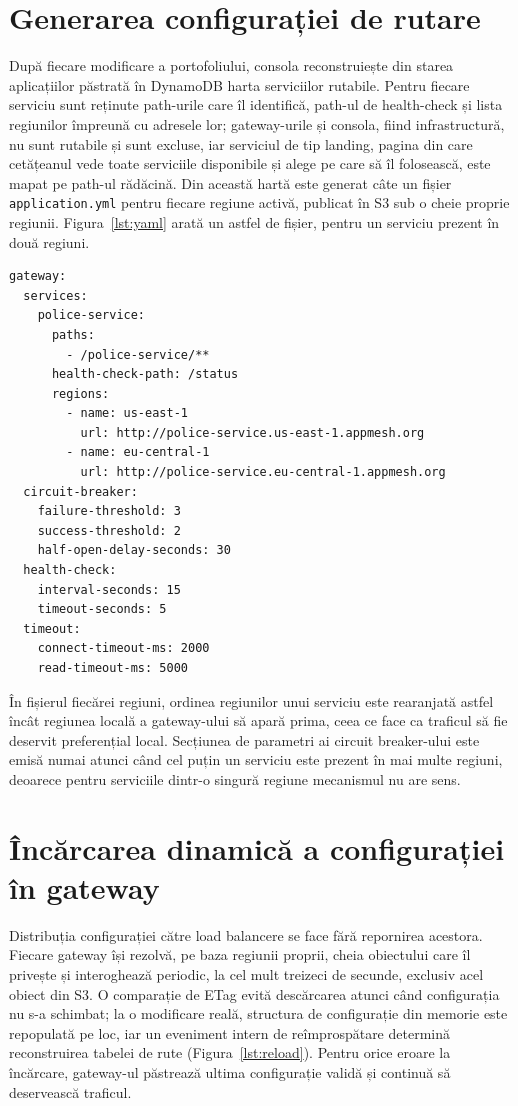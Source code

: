 \documentclass[12pt,a4paper]{report}
\begin{document}
\section{Generarea configurației de rutare}
După fiecare modificare a portofoliului, consola reconstruiește din starea aplicațiilor păstrată în DynamoDB harta serviciilor rutabile. Pentru fiecare serviciu sunt reținute path-urile care îl identifică, path-ul de health-check și lista regiunilor împreună cu adresele lor; gateway-urile și consola, fiind infrastructură, nu sunt rutabile și sunt excluse, iar serviciul de tip landing, pagina din care cetățeanul vede toate serviciile disponibile și alege pe care să îl folosească, este mapat pe path-ul rădăcină. Din această hartă este generat câte un fișier \texttt{application.yml} pentru fiecare regiune activă, publicat în S3 sub o cheie proprie regiunii. Figura~\ref{lst:yaml} arată un astfel de fișier, pentru un serviciu prezent în două regiuni.

\begin{lstlisting}
gateway:
  services:
    police-service:
      paths:
        - /police-service/**
      health-check-path: /status
      regions:
        - name: us-east-1
          url: http://police-service.us-east-1.appmesh.org
        - name: eu-central-1
          url: http://police-service.eu-central-1.appmesh.org
  circuit-breaker:
    failure-threshold: 3
    success-threshold: 2
    half-open-delay-seconds: 30
  health-check:
    interval-seconds: 15
    timeout-seconds: 5
  timeout:
    connect-timeout-ms: 2000
    read-timeout-ms: 5000
\end{lstlisting}
\label{lst:yaml}

În fișierul fiecărei regiuni, ordinea regiunilor unui serviciu este rearanjată astfel încât regiunea locală a gateway-ului să apară prima, ceea ce face ca traficul să fie deservit preferențial local. Secțiunea de parametri ai circuit breaker-ului este emisă numai atunci când cel puțin un serviciu este prezent în mai multe regiuni, deoarece pentru serviciile dintr-o singură regiune mecanismul nu are sens.

\section{Încărcarea dinamică a configurației în gateway}
Distribuția configurației către load balancere se face fără repornirea acestora. Fiecare gateway își rezolvă, pe baza regiunii proprii, cheia obiectului care îl privește și interoghează periodic, la cel mult treizeci de secunde, exclusiv acel obiect din S3. O comparație de ETag evită descărcarea atunci când configurația nu s-a schimbat; la o modificare reală, structura de configurație din memorie este repopulată pe loc, iar un eveniment intern de reîmprospătare determină reconstruirea tabelei de rute (Figura~\ref{lst:reload}). Pentru orice eroare la încărcare, gateway-ul păstrează ultima configurație validă și continuă să deservească traficul.
\end{document}
